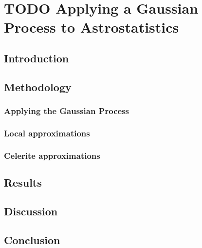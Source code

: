 \section{TODO Applying a Gaussian Process to Astrostatistics}
% 
% 
% 
% 
% 
% 
% 
% 


\subsection{Introduction}


\subsection{Methodology}


\subsubsection{Applying the Gaussian Process}


\subsubsection{Local approximations}


\subsubsection{Celerite approximations}


\subsection{Results}


\subsection{Discussion}


\subsection{Conclusion}
